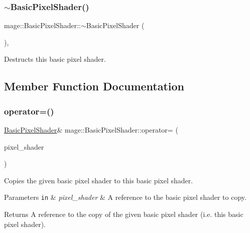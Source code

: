 \subsubsection{\texorpdfstring{$\sim$\+Basic\+Pixel\+Shader()}{~BasicPixelShader()}}
{\footnotesize\ttfamily mage\+::\+Basic\+Pixel\+Shader\+::$\sim$\+Basic\+Pixel\+Shader (\begin{DoxyParamCaption}{ }\end{DoxyParamCaption})\hspace{0.3cm}{\ttfamily [virtual]}, {\ttfamily [default]}}

Destructs this basic pixel shader. 

\subsection{Member Function Documentation}
\hypertarget{classmage_1_1_basic_pixel_shader_a9656fdae2d17691d3e7dd850e7844efb}{}\label{classmage_1_1_basic_pixel_shader_a9656fdae2d17691d3e7dd850e7844efb} 
\subsubsection{\texorpdfstring{operator=()}{operator=()}\hspace{0.1cm}{\footnotesize\ttfamily [1/2]}}
{\footnotesize\ttfamily \hyperlink{classmage_1_1_basic_pixel_shader}{Basic\+Pixel\+Shader}\& mage\+::\+Basic\+Pixel\+Shader\+::operator= (\begin{DoxyParamCaption}\item[{const \hyperlink{classmage_1_1_basic_pixel_shader}{Basic\+Pixel\+Shader} \&}]{pixel\+\_\+shader }\end{DoxyParamCaption})\hspace{0.3cm}{\ttfamily [delete]}}

Copies the given basic pixel shader to this basic pixel shader.


\begin{DoxyParams}[1]{Parameters}
\mbox{\tt in}  & {\em pixel\+\_\+shader} & A reference to the basic pixel shader to copy. \\
\hline
\end{DoxyParams}
\begin{DoxyReturn}{Returns}
A reference to the copy of the given basic pixel shader (i.\+e. this basic pixel shader). 
\end{DoxyReturn}
\hypertarget{classmage_1_1_basic_pixel_shader_a5d6224f0454d1d1f9583f6b9f8ad8201}{}\label{classmage_1_1_basic_pixel_shader_a5d6224f0454d1d1f9583f6b9f8ad8201} 
